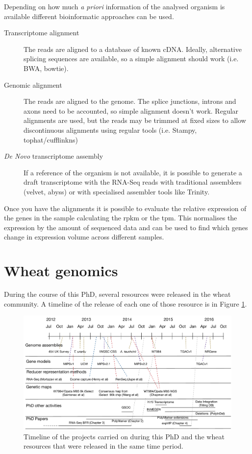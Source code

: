 Depending on how much \textit{a priori} information of the analysed organism is available different bioinformatic approaches can be used.
\begin{description}
\item[Transcriptome alignment] The reads are aligned to a database of known cDNA. Ideally, alternative splicing sequences are available, so a simple alignment should work (i.e. BWA, bowtie). 
\item[Genomic alignment] The reads are aligned to the genome. The splice junctions, introns and axons need to be accounted, so simple alignment doesn't work. Regular alignments are used, but the reads may be trimmed at fixed sizes to allow discontinuous alignments using regular tools (i.e. Stampy, tophat/cufflinkns)
\item[\textit{De Novo} transcriptome assembly] If a reference of the organism is not available, it is possible to generate a draft transcriptome with the RNA-Seq reads with traditional assemblers (velvet, abyss) or with specialised assembler tools like Trinity. 
\end{description}

Once you have the alignments it is possible to evaluate the relative expression of the genes in the sample calculating the \gls{rpkm} or the \gls{tpm}. This normalises the expression by the amount of sequenced data and can be used to find which genes change in expression volume across different samples.   


\section{Wheat genomics}
\label{lit:wheatResourcers}

During the course of this PhD, several resources were released in the wheat community. A timeline of the release of each one of those resource is in Figure \ref{fig:intro:timeline}. 

 \begin{figure}
  \centering
  \includegraphics[width=1\textheight]{Introduction/RicardoPhdTimelineV1.pdf}
  \caption[PhD timeline.]{Timeline of the projects carried on during this PhD and the wheat resources that were released in the same time period. }
  \label{fig:intro:timeline}
 \end{figure}
